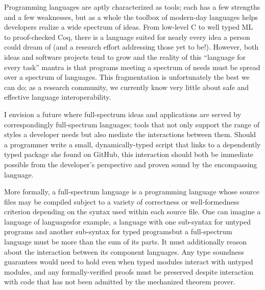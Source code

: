 \documentclass{article}
\begin{document}
Programming languages are aptly characterized as tools; each has a few strengths and a few weaknesses, but as a whole the toolbox of modern-day languages helps developers realize a wide spectrum of ideas.
From low-level C to well typed ML to proof-checked Coq, there is a language suited for nearly every idea a person could dream of (and a research effort addressing those yet to be!).
However, both ideas and software projects tend to grow and the reality of this ``language for every task'' mantra is that programs meeting a spectrum of needs must be spread over a spectrum of languages.
This fragmentation is unfortunately the best we can do; as a research community, we currently know very little about safe and effective language interoperability.

I envision a future where full-spectrum ideas and applications are served by correspondingly full-spectrum languages; tools that not only support the range of styles a developer needs but also mediate the interactions between them.
Should a programmer write a small, dynamically-typed script that links to a dependently typed package she found on GitHub, this interaction should both be immediate possible from the developer's perspective and proven sound by the encompassing language.

More formally, a full-spectrum language is a programming language whose source files may be compiled subject to a variety of correctness or well-formedness criterion depending on the syntax used within each source file.
One can imagine a language of languages\textemdash for example, a language with one sub-syntax for untyped programs and another sub-syntax for typed programs\textemdash but a full-spectrum language must be more than the sum of its parts.
It must additionally reason about the interaction between its component languages.
Any type soundness guarantees would need to hold even when typed modules interact with untyped modules, and any formally-verified proofs must be preserved despite interaction with code that has not been admitted by the mechanized theorem prover.
\end{document}
